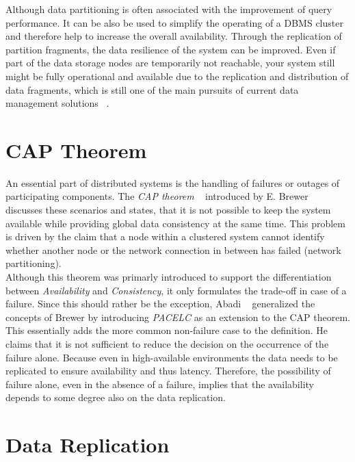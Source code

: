 Although data partitioning is often associated with the improvement of query performance.
It can be also be used to simplify the operating of a DBMS cluster and therefore help 
to increase the overall availability.
Through the replication of partition fragments, the data resilience of the system
can be improved. Even if part of the data storage nodes are temporarily not 
reachable, your system still might be fully operational and available due to the 
replication and distribution of data fragments, which is still one of the main 
pursuits of current data management solutions ~\cite{dbre2017}.







\section{CAP Theorem}
\label{sec:cap}
An essential part of distributed systems is the handling of failures or outages of participating components. 
The \emph{CAP theorem} ~\cite{cap2002} introduced by E. Brewer ~\cite{brewer:2000} discusses these scenarios and states, that it is not possible 
to keep the system available while providing global data consistency at the same time.
This problem is driven by the claim that a node within a clustered system cannot identify whether another node or the 
network connection in between has failed (network partitioning).\\
Although this theorem was primarly introduced to support the differentiation between \emph{Availability} and \emph{Consistency}, 
it only formulates the trade-off in case of a failure.
Since this should rather be the exception, Abadi ~\cite{abadi2012} generalized the concepts of Brewer by introducing \emph{PACELC} as an extension to the CAP theorem.
This essentially adds the more common non-failure case to the definition.
He claims that it is not sufficient to reduce the decision on the occurrence of the failure alone. 
Because even in high-available environments the data needs to be replicated to ensure availability and thus latency. 
Therefore, the possibility of failure alone, even in the absence of a failure, implies that the availability depends to some degree also on the data replication.





\section{Data Replication}

